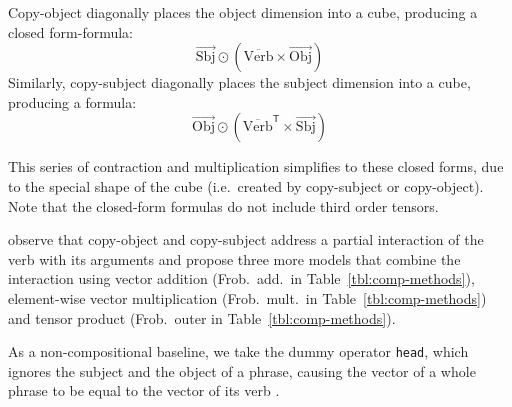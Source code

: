 Copy-object diagonally places the object dimension into a cube, producing a closed form-formula:
\begin{equation*}
  \overrightarrow{\text{Sbj}} \odot (\overline{\text{Verb}} \times \overrightarrow{\text{Obj}})
\end{equation*}
Similarly, copy-subject diagonally places the subject dimension into a cube, producing a formula:
\begin{equation*}
  \overrightarrow{\text{Obj}} \odot (\overline{\text{Verb}}^{\mathsf{T}} \times \overrightarrow{\text{Sbj}})
\end{equation*}

This series of contraction and multiplication simplifies to these closed forms, due to the special shape of the cube (i.e.~created by copy-subject or copy-object). Note that the closed-form formulas do not include third order tensors.

 observe that copy-object and copy-subject address a partial interaction of the verb with its arguments and propose three more models that combine the interaction using vector addition (Frob.~add.~in Table~\ref{tbl:comp-methods}), element-wise vector multiplication (Frob.~mult.~in Table~\ref{tbl:comp-methods}) and tensor product (Frob.~outer in Table~\ref{tbl:comp-methods}).

As a non-compositional baseline, we take the dummy operator \texttt{head}, which ignores the subject and the object of a phrase, causing the vector of a whole phrase to be equal to the vector of its verb \cite{milajevs-EtAl:2014:EMNLP2014}. 

